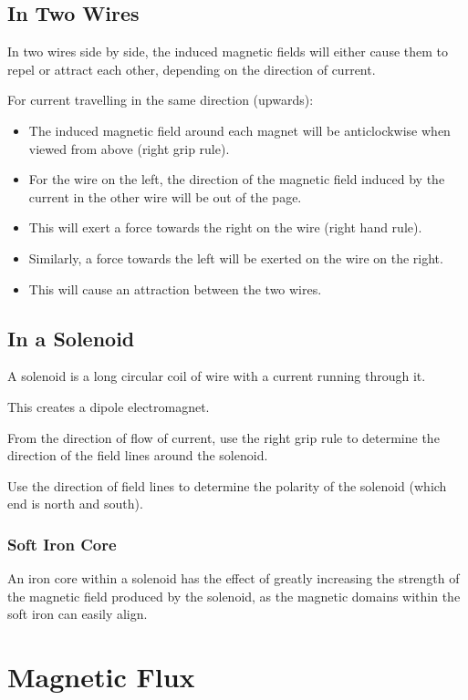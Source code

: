 \documentclass[a4paper,11pt]{article}
\begin{document}
\subsection{In Two Wires}

In two wires side by side, the induced magnetic fields will either cause them
to repel or attract each other, depending on the direction of current.

For current travelling in the same direction (upwards):

\begin{itemize}
\item The induced magnetic field around each magnet will be anticlockwise when
	viewed from above (right grip rule).
\item For the wire on the left, the direction of the magnetic field induced by
	the current in the other wire will be out of the page.
\item This will exert a force towards the right on the wire (right hand rule).
\item Similarly, a force towards the left will be exerted on the wire on the
	right.
\item This will cause an attraction between the two wires.
\end{itemize}


\subsection{In a Solenoid}

A solenoid is a long circular coil of wire with a current running through it.

This creates a dipole electromagnet.

From the direction of flow of current, use the right grip rule to determine the
direction of the field lines around the solenoid.

Use the direction of field lines to determine the polarity of the solenoid
(which end is north and south).


\subsubsection{Soft Iron Core}

An iron core within a solenoid has the effect of greatly increasing the
strength of the magnetic field produced by the solenoid, as the magnetic
domains within the soft iron can easily align.




\section{Magnetic Flux}
\end{document}
